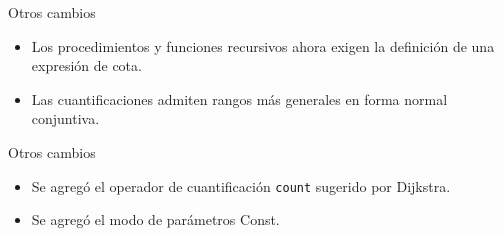 \begin{frame}{Otros cambios}
\begin{itemize}
  \item Los procedimientos y funciones recursivos ahora exigen la definición de una expresión de cota. \boundproc{}

  \item Las cuantificaciones admiten rangos más generales en forma normal conjuntiva. \cnfquant{}
\end{itemize}
\end{frame}

\begin{frame}{Otros cambios}
\begin{itemize}
  \item Se agregó el operador de cuantificación \texttt{count} sugerido por Dijkstra. \countquant{}

  \item Se agregó el modo de parámetros Const. \constmode{}

\end{itemize}
\end{frame}
